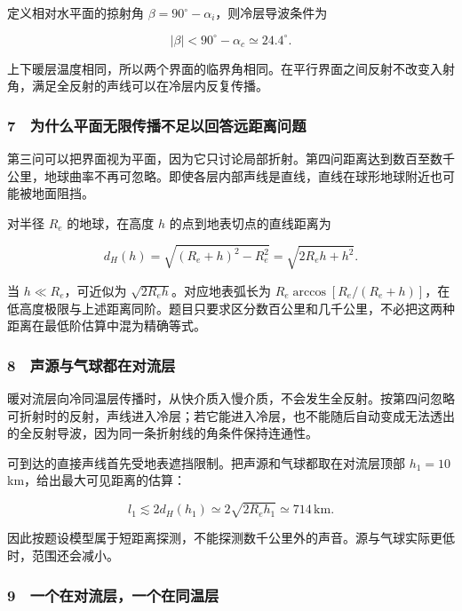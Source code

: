 \documentclass[12pt,a4paper,fontset=fandol]{ctexart}
\begin{document}
定义相对水平面的掠射角 \(\beta=90^\circ-\alpha_i\)，则冷层导波条件为

\[|\beta|<90^\circ-\alpha_c\simeq24.4^\circ.\]

上下暖层温度相同，所以两个界面的临界角相同。在平行界面之间反射不改变入射角，满足全反射的声线可以在冷层内反复传播。

\subsubsection{7　为什么平面无限传播不足以回答远距离问题}\label{ux4e3aux4ec0ux4e48ux5e73ux9762ux65e0ux9650ux4f20ux64adux4e0dux8db3ux4ee5ux56deux7b54ux8fdcux8dddux79bbux95eeux9898}

第三问可以把界面视为平面，因为它只讨论局部折射。第四问距离达到数百至数千公里，地球曲率不再可忽略。即使各层内部声线是直线，直线在球形地球附近也可能被地面阻挡。

对半径 \(R_e\) 的地球，在高度 \(h\) 的点到地表切点的直线距离为

\[d_H(h)=\sqrt{(R_e+h)^2-R_e^2}
=\sqrt{2R_eh+h^2}.\]

当 \(h\ll R_e\)，可近似为 \(\sqrt{2R_eh}\)。对应地表弧长为
\(R_e\arccos[R_e/(R_e+h)]\)，在低高度极限与上述距离同阶。题目只要求区分数百公里和几千公里，不必把这两种距离在最低阶估算中混为精确等式。

\subsubsection{8　声源与气球都在对流层}\label{ux58f0ux6e90ux4e0eux6c14ux7403ux90fdux5728ux5bf9ux6d41ux5c42}

暖对流层向冷同温层传播时，从快介质入慢介质，不会发生全反射。按第四问忽略可折射时的反射，声线进入冷层；若它能进入冷层，也不能随后自动变成无法透出的全反射导波，因为同一条折射线的角条件保持连通性。

可到达的直接声线首先受地表遮挡限制。把声源和气球都取在对流层顶部
\(h_1=10\) km，给出最大可见距离的估算：

\[l_1\lesssim2d_H(h_1)
\simeq2\sqrt{2R_eh_1}\simeq714\,\mathrm{km}.\]

因此按题设模型属于短距离探测，不能探测数千公里外的声音。源与气球实际更低时，范围还会减小。

\subsubsection{9　一个在对流层，一个在同温层}\label{ux4e00ux4e2aux5728ux5bf9ux6d41ux5c42ux4e00ux4e2aux5728ux540cux6e29ux5c42}
\end{document}
